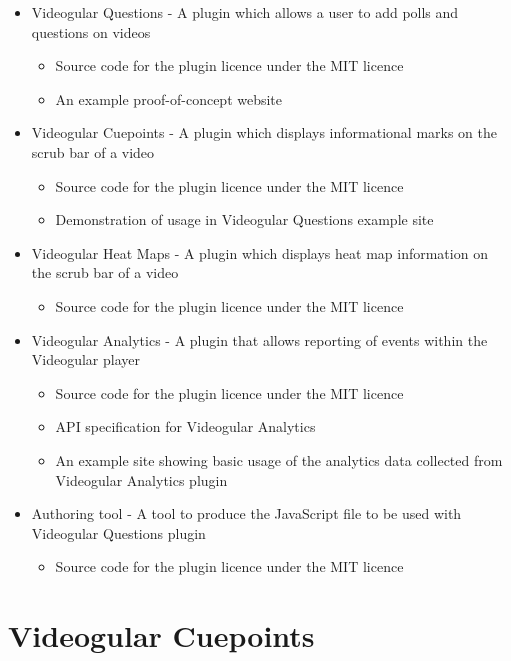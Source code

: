 \documentclass[12pt,a4paper]{article}
\begin{document}
\begin{itemize}
\item Videogular Questions - A plugin which allows a user to add polls and questions on videos
	\begin{itemize}
	\item Source code for the plugin licence under the MIT licence
	\item An example proof-of-concept website
	\end{itemize}
	
\item Videogular Cuepoints - A plugin which displays informational marks on the scrub bar of a video
	\begin{itemize}
	\item Source code for the plugin licence under the MIT licence
	\item Demonstration of usage in Videogular Questions example site
	\end{itemize}
	
\item Videogular Heat Maps - A plugin which displays heat map information on the scrub bar of a video
	\begin{itemize}
	\item Source code for the plugin licence under the MIT licence
	\end{itemize}
	
\item Videogular Analytics - A plugin that allows reporting of events within the Videogular player
	\begin{itemize}
	\item Source code for the plugin licence under the MIT licence
	\item API specification for Videogular Analytics
	\item An example site showing basic usage of the analytics data collected from Videogular Analytics plugin
	\end{itemize}
	
\item Authoring tool - A tool to produce the JavaScript file to be used with Videogular Questions plugin
	\begin{itemize}
	\item Source code for the plugin licence under the MIT licence
	\end{itemize}
\end{itemize}

\section{Videogular Cuepoints}
\end{document}
